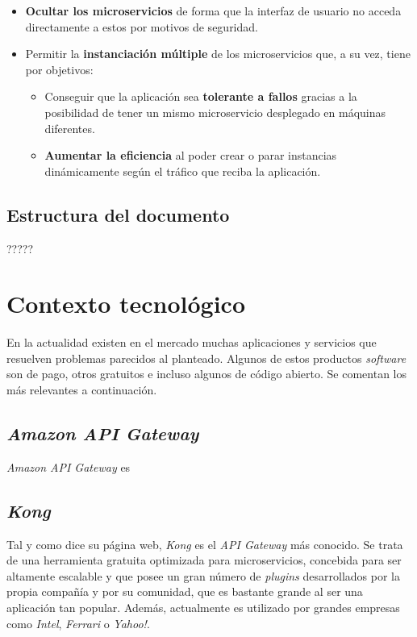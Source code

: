 \documentclass[11pt,spanish,listoffigures]{tfgetsinf}
\begin{document}
\begin{itemize}

	\item \textbf{Ocultar los microservicios} de forma que la interfaz de usuario no acceda directamente a estos por motivos de seguridad.
	
	\item Permitir la \textbf{instanciación múltiple} de los microservicios que, a su vez, tiene por objetivos:
		\begin{itemize}
		
			\item Conseguir que la aplicación sea \textbf{tolerante a fallos} gracias a la posibilidad de tener un mismo microservicio desplegado en máquinas diferentes.
			
			\item \textbf{Aumentar la eficiencia} al poder crear o parar instancias dinámicamente según el tráfico que reciba la aplicación.
			
		\end{itemize}

\end{itemize}

\section{Estructura del documento}

?????


\chapter{Contexto tecnológico}

En la actualidad existen en el mercado muchas aplicaciones y servicios que resuelven problemas parecidos al planteado. Algunos de estos productos \emph{software} son de pago, otros gratuitos e incluso algunos de código abierto. Se comentan los más relevantes a continuación.

\section{\emph{Amazon API Gateway}}
\emph{Amazon API Gateway} \cite{Amazon} es
	
\section{\emph{Kong}}
Tal y como dice su página web, \emph{Kong} \cite{Kong} es el \emph{API Gateway} más conocido. Se trata de una herramienta gratuita optimizada para microservicios, concebida para ser altamente escalable y que posee un gran número de \emph{plugins} desarrollados por la propia compañía y por su comunidad, que es bastante grande al ser una aplicación tan popular. Además, actualmente es utilizado por grandes empresas como \emph{Intel}, \emph{Ferrari} o \emph{Yahoo!}.
	
\end{document}
